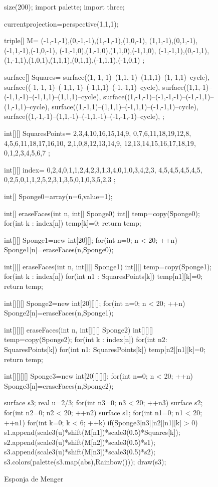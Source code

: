 \begin{figure}[!ht]
	\centering
	\begin{asy}
	size(200);
	import palette;
	import three;

	currentprojection=perspective(1,1,1);

	triple[] M=
	{
	(-1,-1,-1),(0,-1,-1),(1,-1,-1),(1,0,-1),
	(1,1,-1),(0,1,-1),(-1,1,-1),(-1,0,-1),
	(-1,-1,0),(1,-1,0),(1,1,0),(-1,1,0),
	(-1,-1,1),(0,-1,1),(1,-1,1),(1,0,1),(1,1,1),(0,1,1),(-1,1,1),(-1,0,1)
	};

	surface[] Squares=
	{
	surface((1,-1,-1)--(1,1,-1)--(1,1,1)--(1,-1,1)--cycle),
	surface((-1,-1,-1)--(-1,1,-1)--(-1,1,1)--(-1,-1,1)--cycle),
	surface((1,1,-1)--(-1,1,-1)--(-1,1,1)--(1,1,1)--cycle),
	surface((1,-1,-1)--(-1,-1,-1)--(-1,-1,1)--(1,-1,1)--cycle),
	surface((1,-1,1)--(1,1,1)--(-1,1,1)--(-1,-1,1)--cycle),
	surface((1,-1,-1)--(1,1,-1)--(-1,1,-1)--(-1,-1,-1)--cycle),
	};

	int[][] SquaresPoints=
	{
	{2,3,4,10,16,15,14,9},
	{0,7,6,11,18,19,12,8},
	{4,5,6,11,18,17,16,10},
	{2,1,0,8,12,13,14,9},
	{12,13,14,15,16,17,18,19},
	{0,1,2,3,4,5,6,7}
	};

	int[][] index=
	{
	{0,2,4},{0,1},{1,2,4},{2,3},{1,3,4},{0,1},{0,3,4},{2,3},
	{4,5},{4,5},{4,5},{4,5},
	{0,2,5},{0,1},{1,2,5},{2,3},{1,3,5},{0,1},{0,3,5},{2,3}
	};

	int[] Sponge0=array(n=6,value=1);

	int[] eraseFaces(int n, int[] Sponge0) {
	int[] temp=copy(Sponge0);
	for(int k : index[n]) {
	temp[k]=0;
	}
	return temp;
	}

	int[][] Sponge1=new int[20][];
	for(int n=0; n < 20; ++n) {
	Sponge1[n]=eraseFaces(n,Sponge0);
	}

	int[][] eraseFaces(int n, int[][] Sponge1) {
	int[][] temp=copy(Sponge1);
	for(int k : index[n])
	for(int n1 : SquaresPoints[k])
	temp[n1][k]=0;
	return temp;
	}

	int[][][] Sponge2=new int[20][][];
	for(int n=0; n < 20; ++n)
	Sponge2[n]=eraseFaces(n,Sponge1);

	int[][][] eraseFaces(int n, int[][][] Sponge2) {
	int[][][] temp=copy(Sponge2);
	for(int k : index[n])
	for(int n2: SquaresPoints[k])
	for(int n1: SquaresPoints[k])
	temp[n2][n1][k]=0;
	return temp;
	}

	int[][][][] Sponge3=new int[20][][][];
	for(int n=0; n < 20; ++n)
	Sponge3[n]=eraseFaces(n,Sponge2);

	surface s3;
	real u=2/3;
	for(int n3=0; n3 < 20; ++n3) {
	surface s2;
	for(int n2=0; n2 < 20; ++n2) {
	surface s1;
	for(int n1=0; n1 < 20; ++n1) {
	for(int k=0; k < 6; ++k) {
	if(Sponge3[n3][n2][n1][k] > 0) {
	s1.append(scale3(u)*shift(M[n1])*scale3(0.5)*Squares[k]);
	}
	}
	}
	s2.append(scale3(u)*shift(M[n2])*scale3(0.5)*s1);
	}
	s3.append(scale3(u)*shift(M[n3])*scale3(0.5)*s2);
	}
	s3.colors(palette(s3.map(abs),Rainbow()));
	draw(s3);
	\end{asy}

	\caption{Esponja de Menger}
\end{figure}



